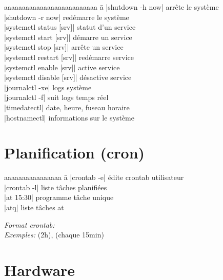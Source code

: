 \documentclass{article}
\begin{document}
\begin{multicols}{4}
    \begin{tabbing}
        aaaaaaaaaaaaaaaaaaaaaaaaaa \= a \kill
        \code|shutdown -h now| \> arrête le système \\
        \code|shutdown -r now| \> redémarre le système \\
        \code|systemctl status [srv]| \> statut d'un service \\
        \code|systemctl start [srv]| \> démarre un service \\
        \code|systemctl stop [srv]| \> arrête un service \\
        \code|systemctl restart [srv]| \> redémarre service \\
        \code|systemctl enable [srv]| \> active service \\
        \code|systemctl disable [srv]| \> désactive service \\
        \code|journalctl -xe| \> logs système \\
        \code|journalctl -f| \> suit logs temps réel \\
        \code|timedatectl| \> date, heure, fuseau horaire \\
        \code|hostnamectl| \> informations sur le système
    \end{tabbing}

    \section*{Planification (cron)}
    \begin{tabbing}
        aaaaaaaaaaaaaaaa \= a \kill
        \code|crontab -e| \> édite crontab utilisateur \\
        \code|crontab -l| \> liste tâches planifiées \\
        \code|at 15:30| \> programme tâche unique \\
        \code|atq| \> liste tâches at
    \end{tabbing}

    \emph{Format crontab:}  \\
    \emph{Exemples:}  (2h),  (chaque 15min)

    \section*{Hardware}


\end{multicols}
\end{document}
